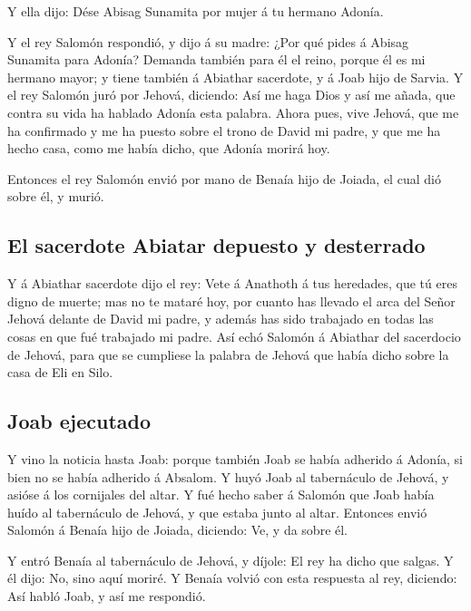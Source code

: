 Y ella dijo: Dése Abisag Sunamita por mujer á tu hermano
Adonía.

 Y el rey Salomón respondió, y dijo á su madre: ¿Por qué
pides á Abisag Sunamita para Adonía? Demanda también para él el reino,
porque él es mi hermano mayor; y tiene también á Abiathar sacerdote, y á
Joab hijo de Sarvia.  Y el rey Salomón juró por Jehová,
diciendo: Así me haga Dios y así me añada, que contra su vida ha hablado
Adonía esta palabra.  Ahora pues, vive Jehová, que me ha
confirmado y me ha puesto sobre el trono de David mi padre, y que me ha
hecho casa, como me había dicho, que Adonía morirá hoy.

 Entonces el rey Salomón envió por mano de Benaía hijo de
Joiada, el cual dió sobre él, y murió.

\hypertarget{el-sacerdote-abiatar-depuesto-y-desterrado}{%
\subsection{El sacerdote Abiatar depuesto y
desterrado}\label{el-sacerdote-abiatar-depuesto-y-desterrado}}

 Y á Abiathar sacerdote dijo el rey: Vete á Anathoth á
tus heredades, que tú eres digno de muerte; mas no te mataré hoy, por
cuanto has llevado el arca del Señor Jehová delante de David mi padre, y
además has sido trabajado en todas las cosas en que fué trabajado mi
padre.  Así echó Salomón á Abiathar del sacerdocio de
Jehová, para que se cumpliese la palabra de Jehová que había dicho sobre
la casa de Eli en Silo.

\hypertarget{joab-ejecutado}{%
\subsection{Joab ejecutado}\label{joab-ejecutado}}

 Y vino la noticia hasta Joab: porque también Joab se
había adherido á Adonía, si bien no se había adherido á Absalom. Y huyó
Joab al tabernáculo de Jehová, y asióse á los cornijales del altar.
 Y fué hecho saber á Salomón que Joab había huído al
tabernáculo de Jehová, y que estaba junto al altar. Entonces envió
Salomón á Benaía hijo de Joiada, diciendo: Ve, y da sobre él.

 Y entró Benaía al tabernáculo de Jehová, y díjole: El
rey ha dicho que salgas. Y él dijo: No, sino aquí moriré. Y Benaía
volvió con esta respuesta al rey, diciendo: Así habló Joab, y así me
respondió.

